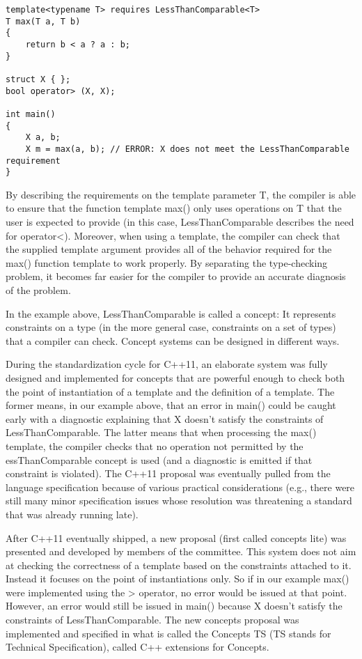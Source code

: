 \begin{lstlisting}[style=styleCXX]
template<typename T> requires LessThanComparable<T>
T max(T a, T b)
{
	return b < a ? a : b;
}

struct X { };
bool operator> (X, X);

int main()
{
	X a, b;
	X m = max(a, b); // ERROR: X does not meet the LessThanComparable requirement
}
\end{lstlisting}

By describing the requirements on the template parameter T, the compiler is able to ensure that the function template max() only uses operations on T that the user is expected to provide (in this case, LessThanComparable describes the need for operator<). Moreover, when using a template, the compiler can check that the supplied template argument provides all of the behavior required for the max() function template to work properly. By separating the type-checking problem, it becomes far easier for the compiler to provide an accurate diagnosis of the problem.

In the example above, LessThanComparable is called a concept: It represents constraints on a type (in the more general case, constraints on a set of types) that a compiler can check. Concept systems can be designed in different ways.

During the standardization cycle for C++11, an elaborate system was fully designed and implemented for concepts that are powerful enough to check both the point of instantiation of a template and the definition of a template. The former means, in our example above, that an error in main() could be caught early with a diagnostic explaining that X doesn’t satisfy the constraints of LessThanComparable. The latter means that when processing the max() template, the compiler checks that no operation not permitted by the  essThanComparable concept is used (and a diagnostic is emitted if that constraint is violated). The C++11 proposal was eventually pulled from the language specification because of various practical considerations (e.g., there were still many minor specification issues whose resolution was threatening a standard that was already running late).

After C++11 eventually shipped, a new proposal (first called concepts lite) was presented and developed by members of the committee. This system does not aim at checking the correctness of a template based on the constraints attached to it. Instead it focuses on the point of instantiations only. So if in our example max() were implemented using the > operator, no error would be issued at that point. However, an error would still be issued in main() because X doesn’t satisfy the constraints of LessThanComparable. The new concepts proposal was implemented and specified in what is called the Concepts TS (TS stands for Technical Specification), called C++ extensions for Concepts.


